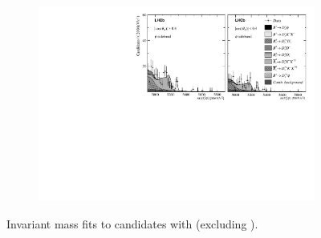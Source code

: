\begin{figure}[!h]
\begin{subfigure}[t]{1.0\textwidth}
    \end{subfigure}
    \begin{subfigure}[t]{1.0\textwidth}
        \centering
        \includegraphics[width=1.0\textwidth]{figs/Appendix_FitCategories/canvas_DsPhiSide_Ds2KKPi_both_summed_splitHel_splitKKPi_s21_s21r1_s24_s26.pdf}\\
    \end{subfigure}
    \caption{Invariant mass fits to \decay{\Bp}{\Dsp\phiz} candidates with \decay{\Dsp}{\Kp\Km\pip} (excluding \decay{\Dsp}{\phiz\pip}).}
\end{figure}
